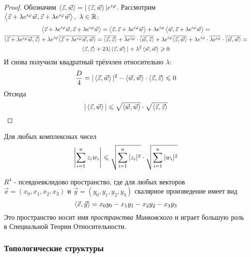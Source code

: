 \begin{proof}
	Обозначим $\left\langle\vec{z}, \vec{w}\right\rangle = |\left\langle\vec{z}, \vec{w}\right\rangle|e^{i\varphi}$. Рассмотрим $\left\langle\vec{z} + \lambda e^{i\varphi} \vec{w}, \vec{z} + \lambda e^{i\varphi} \vec{w}\right\rangle,\ \lambda \in \mathbb{R}$:
	\begin{multline*}
		\left\langle\vec{z} + \lambda e^{i\varphi} \vec{w}, \vec{z} + \lambda e^{i\varphi} \vec{w}\right\rangle = \left\langle\vec{z}, \vec{z} + \lambda e^{i\varphi} \vec{w}\right\rangle + \lambda e^{i\varphi} \left\langle\vec{w}, \vec{z} + \lambda e^{i\varphi} \vec{w}\right\rangle =
		\\
		\overline{\left\langle\vec{z} + \lambda e^{i\varphi} \vec{w}, \vec{z}\right\rangle} + \lambda e^{i\varphi} \overline{\left\langle\vec{z} + \lambda e^{i\varphi} \vec{w}, \vec{w}\right\rangle} = \overline{\left\langle\vec{z}, \vec{z}\right\rangle} + \overline{\lambda e^{i \varphi}} \cdot \overline{\left\langle\vec{w}, \vec{z}\right\rangle} + \lambda e^{i\varphi} \overline{\left\langle\vec{z}, \vec{w}\right\rangle} + \lambda e^{i\varphi} \cdot \overline{\lambda e^{i\varphi}} \cdot \overline{\left\langle\vec{w}, \vec{w}\right\rangle} =
		\\
		\left\langle\vec{z}, \vec{z}\right\rangle + 2\lambda |\left\langle\vec{z}, \vec{w}\right\rangle| + \lambda^2 \left\langle\vec{w}, \vec{w}\right\rangle \geqslant 0
	\end{multline*}
	И снова получили квадратный трёхчлен относительно $\lambda$:
	\[
		\frac{D}{4} = |\left\langle\vec{z}, \vec{w}\right\rangle|^2 - \left\langle\vec{w}, \vec{w}\right\rangle \cdot \left\langle\vec{z}, \vec{z}\right\rangle \leqslant 0
	\]
	Отсюда
	\[
		|\left\langle\vec{z}, \vec{w}\right\rangle| \leqslant \sqrt{\left\langle\vec{w}, \vec{w}\right\rangle} \cdot \sqrt{\left\langle\vec{z}, \vec{z}\right\rangle}
	\]
\end{proof}

\begin{corollary}
	Для любых комплексных чисел
	\[
		\left|\sum\limits_{i = 1}^n z_i w_i\right| \leqslant \sqrt{\sum\limits_{i = 1}^n |z_i|^2} \cdot \sqrt{\sum\limits_{i = 1}^n |w_i|^2}
	\]
\end{corollary}

\begin{example}
	$R^4$ - псевдоевклидово пространство, где для любых векторов $\vec{x} = (x_0, x_1, x_2, x_3)$ и $\vec{y} = (y_0, y_1, y_2, y_3)$ скалярное произведение имеет вид
	\[
		\left\langle\vec{x}, \vec{y}\right\rangle = x_0 y_0 - x_1 y_1 - x_2 y_2 - x_3 y_3
	\]
	Это пространство носит имя \textit{пространства Минковского} и играет большую роль в Специальной Теории Относительности.
\end{example}

\subsubsection*{Топологические структуры}

